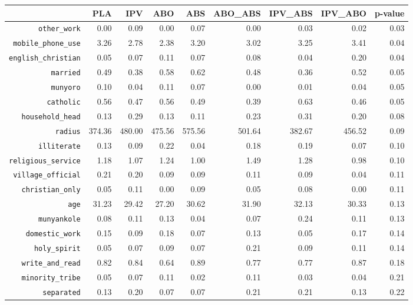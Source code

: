 \begin{longtable}{rrrrrrrrr}
  \hline
 & PLA & IPV & ABO & ABS & ABO\_ABS & IPV\_ABS & IPV\_ABO & p-value \\ 
  \hline
{\texttt{other\_work}} & 0.00 & 0.09 & 0.00 & 0.07 & 0.00 & 0.03 & 0.02 & 0.03 \\ 
  {\texttt{mobile\_phone\_use}} & 3.26 & 2.78 & 2.38 & 3.20 & 3.02 & 3.25 & 3.41 & 0.04 \\ 
  {\texttt{english\_christian}} & 0.05 & 0.07 & 0.11 & 0.07 & 0.08 & 0.04 & 0.20 & 0.04 \\ 
  {\texttt{married}} & 0.49 & 0.38 & 0.58 & 0.62 & 0.48 & 0.36 & 0.52 & 0.05 \\ 
  {\texttt{munyoro}} & 0.10 & 0.04 & 0.11 & 0.07 & 0.00 & 0.01 & 0.04 & 0.05 \\ 
  {\texttt{catholic}} & 0.56 & 0.47 & 0.56 & 0.49 & 0.39 & 0.63 & 0.46 & 0.05 \\ 
  {\texttt{household\_head}} & 0.13 & 0.29 & 0.13 & 0.11 & 0.23 & 0.31 & 0.20 & 0.08 \\ 
  {\texttt{radius}} & 374.36 & 480.00 & 475.56 & 575.56 & 501.64 & 382.67 & 456.52 & 0.09 \\ 
  {\texttt{illiterate}} & 0.13 & 0.09 & 0.22 & 0.04 & 0.18 & 0.19 & 0.07 & 0.10 \\ 
  {\texttt{religious\_service}} & 1.18 & 1.07 & 1.24 & 1.00 & 1.49 & 1.28 & 0.98 & 0.10 \\ 
  {\texttt{village\_official}} & 0.21 & 0.20 & 0.09 & 0.09 & 0.11 & 0.09 & 0.04 & 0.11 \\ 
  {\texttt{christian\_only}} & 0.05 & 0.11 & 0.00 & 0.09 & 0.05 & 0.08 & 0.00 & 0.11 \\ 
  {\texttt{age}} & 31.23 & 29.42 & 27.20 & 30.62 & 31.90 & 32.13 & 30.33 & 0.13 \\ 
  {\texttt{munyankole}} & 0.08 & 0.11 & 0.13 & 0.04 & 0.07 & 0.24 & 0.11 & 0.13 \\ 
  {\texttt{domestic\_work}} & 0.15 & 0.09 & 0.18 & 0.07 & 0.13 & 0.05 & 0.17 & 0.14 \\ 
  {\texttt{holy\_spirit}} & 0.05 & 0.07 & 0.09 & 0.07 & 0.21 & 0.09 & 0.11 & 0.14 \\ 
  {\texttt{write\_and\_read}} & 0.82 & 0.84 & 0.64 & 0.89 & 0.77 & 0.77 & 0.87 & 0.18 \\ 
  {\texttt{minority\_tribe}} & 0.05 & 0.07 & 0.11 & 0.02 & 0.11 & 0.03 & 0.04 & 0.21 \\ 
  {\texttt{separated}} & 0.13 & 0.20 & 0.07 & 0.07 & 0.21 & 0.21 & 0.13 & 0.22 \\ 

\end{longtable}
